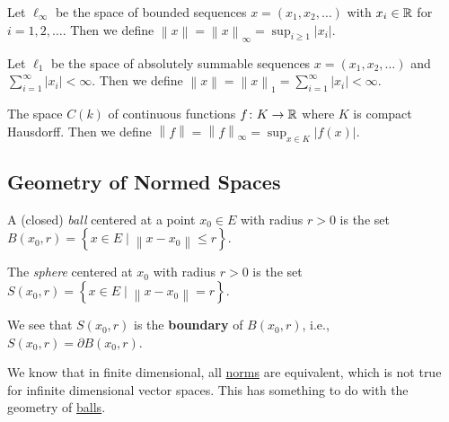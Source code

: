 \begin{eg}
	Let \(\ell _\infty \) be the space of bounded sequences \(x = (x_1, x_2, \ldots )\) with \(x_i\in \mathbb{\MakeUppercase{r}} \) for \(i = 1, 2, \ldots \). Then we define \(\left\lVert x\right\rVert = \left\lVert x\right\rVert _\infty = \sup _{i \geq 1}\left\vert x_i \right\vert \).
\end{eg}

\begin{eg}
	Let \(\ell _1\) be the space of absolutely summable sequences \(x = (x_1, x_2, \ldots)\) and \(\sum_{i=1}^{\infty} \left\vert x_i \right\vert < \infty\). Then we define \(\left\lVert x\right\rVert = \left\lVert x\right\rVert _1 = \sum_{i=1}^{\infty} \left\vert x_i \right\vert < \infty\).
\end{eg}

\begin{eg}
	The space \(C(k)\) of continuous functions \(f\colon K\to \mathbb{\MakeUppercase{r}} \) where \(K\) is compact Hausdorff. Then we define \(\left\lVert f\right\rVert = \left\lVert f\right\rVert _\infty = \sup _{x\in K}\left\vert f(x) \right\vert \).
\end{eg}

\subsection{Geometry of Normed Spaces}
\begin{definition}[Ball]\label{def:ball}
	A (closed) \emph{ball} centered at a point \(x_0\in E\) with radius \(r>0\) is the set \(B(x_0, r) = \left\{ x\in E\mid \left\lVert x - x_0\right\rVert \leq r \right\} \).
\end{definition}

\begin{definition}[Sphere]\label{def:sphere}
	The \emph{sphere} centered at \(x_0\) with radius \(r>0\) is the set \(S(x_0, r) = \left\{ x\in E\mid \left\lVert x - x_0\right\rVert = r\right\} \).
\end{definition}

\begin{remark}
	We see that \(S(x_0, r)\) is the \textbf{boundary} of \(B(x_0, r)\), i.e., \(S(x_0, r) = \partial B(x_0, r)\).
\end{remark}

\begin{note}
	We know that in finite dimensional, all \hyperref[def:norm]{norms} are equivalent, which is not true for infinite dimensional vector spaces. This has something to do with the geometry of \hyperref[def:ball]{balls}.
\end{note}

